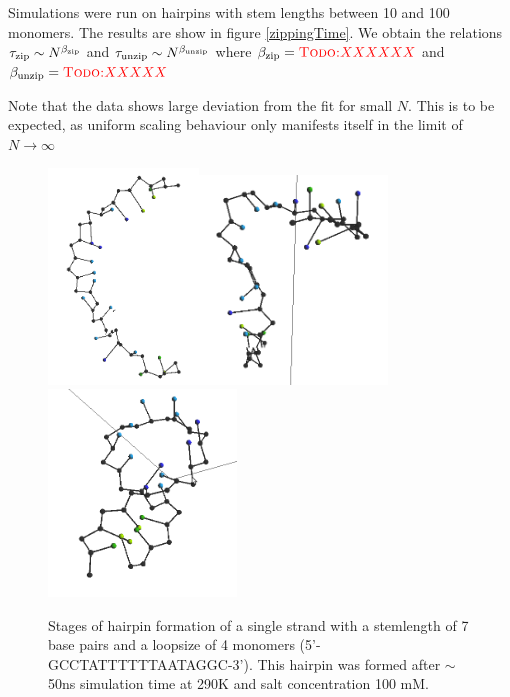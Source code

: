 Simulations were run on hairpins with stem lengths between 10 and 100 monomers. 
The results are show in figure \ref{zippingTime}. We obtain the relations ${\tau_\text{zip}} \sim N^{\beta_\text{zip}}$ and ${\tau_\text{unzip}} \sim N^{\beta_\text{unzip}}$ where ${\beta_\text{zip}} = \textcolor{red}{\textsc{Todo:} XXXXXX}$ and ${\beta_\text{unzip}} = \textcolor{red}{\textsc{Todo:} XXXXX}$

Note that the data shows large deviation from the fit for small $N$. This is to be expected, as uniform scaling behaviour only manifests itself in the limit of $N \to \infty$


\begin{figure}[hbt]
\begin{center}
\includegraphics[width=4cm]{images/results_hairpin1}\includegraphics[width=5cm]{images/results_hairpin2}\includegraphics[width=5cm]{images/results_hairpin3}
\end{center}
\caption{Stages of hairpin formation of a single strand with a stemlength of 7 base pairs and a loopsize of 4 monomers (5'-GCCTATTTTTTAATAGGC-3'). This hairpin was formed after $\sim$ 50ns simulation time at 290K and salt concentration 100 mM.}
\label{results_hairpin}
\end{figure}




